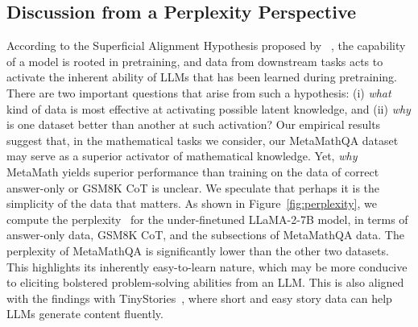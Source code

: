     \vspace{-2mm}
    \subsection{Discussion from a Perplexity Perspective}    
    \vspace{-1.5mm}

    According to the Superficial Alignment Hypothesis proposed by ~\citet{zhou2023lima}, the capability of a model is rooted in pretraining, and data from downstream tasks acts to activate the inherent ability of LLMs that has been learned during pretraining. There are two important questions that arise from such a hypothesis: (i) \textit{what} kind of data is most effective at activating possible latent knowledge, and (ii) \textit{why} is one dataset better than another at such activation? Our empirical results suggest that, in the mathematical tasks we consider, our MetaMathQA dataset may serve as a superior activator of mathematical knowledge. Yet, \textit{why} MetaMath yields superior performance than training on the data of correct answer-only or GSM8K CoT is unclear. We speculate that perhaps it is the simplicity of the data that matters. As shown in Figure~\ref{fig:perplexity}, we compute the perplexity~\citep{wang2023making,marion2023less} for the under-finetuned {LLaMA-2-7B} model, in terms of answer-only data, GSM8K CoT, and the subsections of {MetaMathQA} data. The perplexity of {MetaMathQA} is significantly lower than the other two datasets. This highlights its inherently easy-to-learn nature, which may be more conducive to eliciting bolstered problem-solving abilities from an LLM. This is also aligned with the findings with TinyStories~\citep{eldan2023tinystories}, where short and easy story data can help LLMs generate content fluently.

    
        

    

    \vspace{-2.00mm}
